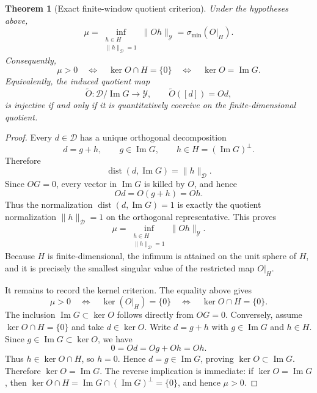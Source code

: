 \documentclass[11pt]{article}
\numberwithin{equation}{section}
\newtheorem{theorem}{Theorem}[section]
\newcommand{\calD}{\mathcal D}
\newcommand{\calY}{\mathcal Y}
\newcommand{\Image}{\operatorname{Im}}
\newcommand{\Dist}{\operatorname{dist}}
\begin{document}
\begin{theorem}[Exact finite-window quotient criterion]\label{thm:exact-quotient-criterion}
Under the hypotheses above,
\begin{equation}\label{eq:mu-singular-value}
    \mu
    =
    \inf_{\substack{h\in H\\ \|h\|_{\calD}=1}}
    \|Oh\|_{\calY}
    =
    \sigma_{\min}(O|_H).
\end{equation}
Consequently,
\begin{equation}\label{eq:positive-mu-kernel}
    \mu>0
    \quad\Longleftrightarrow\quad
    \ker O\cap H=\{0\}
    \quad\Longleftrightarrow\quad
    \ker O=\Image G.
\end{equation}
Equivalently, the induced quotient map
\[
    \widetilde O:\calD/\Image G\to\calY,
    \qquad
    \widetilde O([d])=Od,
\]
is injective if and only if it is quantitatively coercive on the finite-dimensional quotient.
\end{theorem}

\begin{proof}
Every $d\in\calD$ has a unique orthogonal decomposition
\[
    d=g+h,
    \qquad
    g\in\Image G,
    \qquad
    h\in H=(\Image G)^\perp.
\]
Therefore
\[
    \Dist(d,\Image G)=\|h\|_{\calD}.
\]
Since $OG=0$, every vector in $\Image G$ is killed by $O$, and hence
\[
    Od=O(g+h)=Oh.
\]
Thus the normalization $\Dist(d,\Image G)=1$ is exactly the quotient normalization
$\|h\|_{\calD}=1$ on the orthogonal representative.  This proves
\[
    \mu
    =
    \inf_{\substack{h\in H\\ \|h\|_{\calD}=1}}
    \|Oh\|_{\calY}.
\]
Because $H$ is finite-dimensional, the infimum is attained on the unit sphere of $H$, and it is precisely the smallest singular value of the restricted map $O|_H$.

It remains to record the kernel criterion.  The equality above gives
\[
    \mu>0
    \quad\Longleftrightarrow\quad
    \ker(O|_H)=\{0\}
    \quad\Longleftrightarrow\quad
    \ker O\cap H=\{0\}.
\]
The inclusion $\Image G\subset\ker O$ follows directly from $OG=0$.  Conversely, assume
$\ker O\cap H=\{0\}$ and take $d\in\ker O$.  Write $d=g+h$ with $g\in\Image G$ and $h\in H$.
Since $g\in\Image G\subset\ker O$, we have
\[
    0=Od=Og+Oh=Oh.
\]
Thus $h\in\ker O\cap H$, so $h=0$.  Hence $d=g\in\Image G$, proving
$\ker O\subset\Image G$.  Therefore $\ker O=
\Image G$.  The reverse implication is immediate: if $\ker O=\Image G$, then
$\ker O\cap H=\Image G\cap(\Image G)^\perp=\{0\}$, and hence $\mu>0$.
\end{proof}
\end{document}
